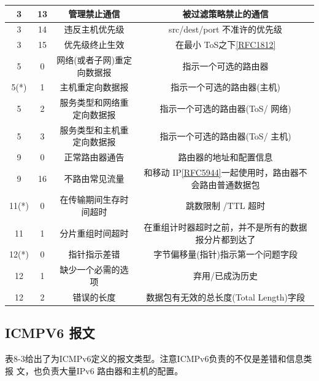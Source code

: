 \begin{table}[H]
\begin{tabular}{c|c|c|c}
    3    &  13  &  管理禁止通信  &  被过滤策略禁止的通信 \\ \hline
    3    &  14  &  违反主机优先级  &  src/dest/port 不准许的优先级 \\ \hline
    3    &  15  &  优先级终止生效  &  在最小
    ToS之下\href{https://www.rfc-editor.org/rfc/rfc1812}{[RFC1812]} \\ \hline
    5    &  0  &  网络(或者子网)重定向数据报  &  指示一个可选的路由器 \\ \hline
    5(*)  &  1  &  主机重定向数据报  &  指示一个可选的路由器(主机) \\ \hline
    5    &  2  &  服务类型和网络重定向数据报  &  指示一个可选的路由器(ToS/ 网络) \\ \hline
    5    &  3  &  服务类型和主机重定向数据报  &  指示一个可选的路由器(ToS/ 主机) \\ \hline
    9    &  0  &  正常路由器通告  &  路由器的地址和配置信息 \\ \hline
    9    &  16  &  不路由常见流量  &  和移动
    IP\href{https://www.rfc-editor.org/rfc/rfc5944}{[RFC5944]}一起使用时，路由器不会路由普通数据包
    \\ \hline
    11(*)  &  0  &  在传输期间生存时间超时  &  跳数限制 /TTL 超时 \\ \hline
    11    &  1  &  分片重组时间超时  &  在重组计时器超时之前，并不是所有的数据报分片都到达了 \\ \hline
    12(*)  &  0  &  指针指示差错  &  字节偏移量(指针)指示第一个问题字段 \\ \hline
    12    &  1  &  缺少一个必需的选项  &  弃用/已成沩历史 \\ \hline
    12    &  2  &  错误的长度  &  数据包有无效的总长度(Total Length)字段 \\ \hline
  \end{tabular}
\end{table}

\subsection{ICMPV6 报文}
表8-3给出了为ICMPv6定义的报文类型。注意ICMPv6负责的不仅是差错和信息类报
文，也负责大量IPv6 路由器和主机的配置。

